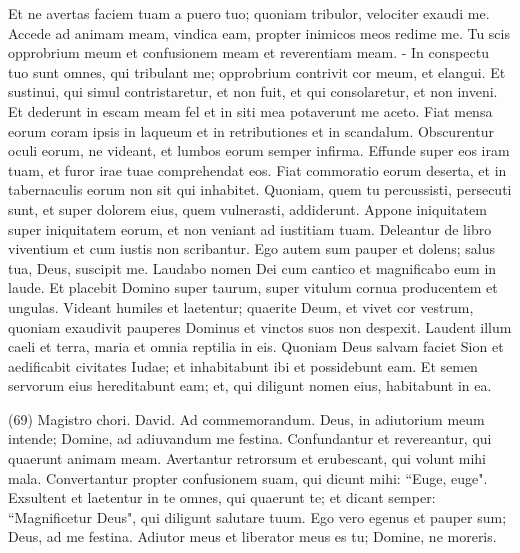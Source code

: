 \begin{biblechapter}
\verse Et ne avertas faciem tuam a puero tuo; quoniam tribulor, velociter exaudi me. 
\verse Accede ad animam meam, vindica eam, propter inimicos meos redime me. 
\verse Tu scis opprobrium meum et confusionem meam et reverentiam meam. - In conspectu tuo sunt omnes, qui tribulant me; 
\verse opprobrium contrivit cor meum, et elangui. Et sustinui, qui simul contristaretur, et non fuit, et qui consolaretur, et non inveni. 
\verse Et dederunt in escam meam fel et in siti mea potaverunt me aceto. 
\verse Fiat mensa eorum coram ipsis in laqueum et in retributiones et in scandalum. 
\verse Obscurentur oculi eorum, ne videant, et lumbos eorum semper infirma. 
\verse Effunde super eos iram tuam, et furor irae tuae comprehendat eos. 
\verse Fiat commoratio eorum deserta, et in tabernaculis eorum non sit qui inhabitet. 
\verse Quoniam, quem tu percussisti, persecuti sunt, et super dolorem eius, quem vulnerasti, addiderunt. 
\verse Appone iniquitatem super iniquitatem eorum, et non veniant ad iustitiam tuam. 
\verse Deleantur de libro viventium et cum iustis non scribantur. 
\verse Ego autem sum pauper et dolens; salus tua, Deus, suscipit me. 
\verse Laudabo nomen Dei cum cantico et magnificabo eum in laude. 
\verse Et placebit Domino super taurum, super vitulum cornua producentem et ungulas. 
\verse Videant humiles et laetentur; quaerite Deum, et vivet cor vestrum, 
\verse quoniam exaudivit pauperes Dominus et vinctos suos non despexit. 
\verse Laudent illum caeli et terra, maria et omnia reptilia in eis. 
\verse Quoniam Deus salvam faciet Sion et aedificabit civitates Iudae; et inhabitabunt ibi et possidebunt eam. 
\verse Et semen servorum eius hereditabunt eam; et, qui diligunt nomen eius, habitabunt in ea. 
\end{biblechapter}

\begin{biblechapter}  (69) 
\verse  Magistro chori. David. Ad commemorandum. 
\verse Deus, in adiutorium meum intende; Domine, ad adiuvandum me festina. 
\verse Confundantur et revereantur, qui quaerunt animam meam. Avertantur retrorsum et erubescant, qui volunt mihi mala. 
\verse Convertantur propter confusionem suam, qui dicunt mihi: “Euge, euge". 
\verse Exsultent et laetentur in te omnes, qui quaerunt te; et dicant semper: “Magnificetur Deus", qui diligunt salutare tuum. 
\verse Ego vero egenus et pauper sum; Deus, ad me festina. Adiutor meus et liberator meus es tu; Domine, ne moreris. 
\end{biblechapter}

